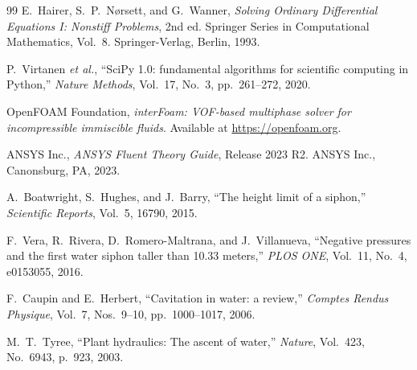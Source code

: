 \documentclass[11pt]{article}
\theoremstyle{definition}
\begin{document}
\begin{thebibliography}{99}
E.~Hairer, S.~P.~N{\o}rsett, and G.~Wanner,
\emph{Solving Ordinary Differential Equations I: Nonstiff Problems}, 2nd ed.
Springer Series in Computational Mathematics, Vol.~8. Springer-Verlag, Berlin, 1993.

P.~Virtanen \emph{et al.},
``SciPy 1.0: fundamental algorithms for scientific computing in Python,''
\emph{Nature Methods}, Vol.~17, No.~3, pp.~261--272, 2020.

OpenFOAM Foundation,
\emph{interFoam: VOF-based multiphase solver for incompressible immiscible fluids}.
Available at \url{https://openfoam.org}.

ANSYS Inc.,
\emph{ANSYS Fluent Theory Guide}, Release 2023 R2.
ANSYS Inc., Canonsburg, PA, 2023.

A.~Boatwright, S.~Hughes, and J.~Barry,
``The height limit of a siphon,''
\emph{Scientific Reports}, Vol.~5, 16790, 2015.

F.~Vera, R.~Rivera, D.~Romero-Maltrana, and J.~Villanueva,
``Negative pressures and the first water siphon taller than 10.33 meters,''
\emph{PLOS ONE}, Vol.~11, No.~4, e0153055, 2016.

F.~Caupin and E.~Herbert,
``Cavitation in water: a review,''
\emph{Comptes Rendus Physique}, Vol.~7, Nos.~9--10, pp.~1000--1017, 2006.

M.~T.~Tyree,
``Plant hydraulics: The ascent of water,''
\emph{Nature}, Vol.~423, No.~6943, p.~923, 2003.

\end{thebibliography}
\end{document}
